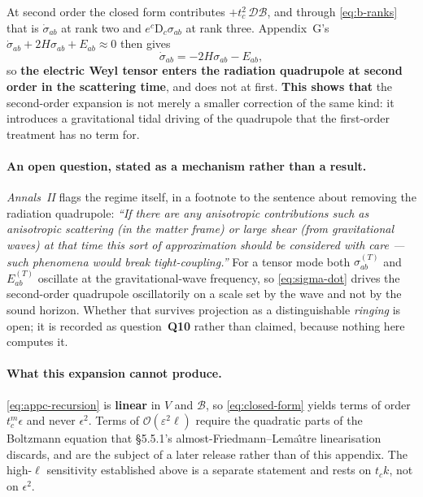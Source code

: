 At second order the closed form contributes $+t_c^2\,\mathcal D\mathcal B$, and
through \eqref{eq:b-ranks} that is $\dot\sigma_{ab}$ at rank two and
$e^c\mathrm D_c\sigma_{ab}$ at rank three. Appendix~G's
$\dot\sigma_{ab}+2H\sigma_{ab}+E_{ab}\approx0$ then gives
\begin{equation}
  \dot\sigma_{ab}=-2H\sigma_{ab}-E_{ab},
  \label{eq:sigma-dot}
\end{equation}
so \textbf{the electric Weyl tensor enters the radiation quadrupole at second
order in the scattering time}, and does not at first. \textbf{This shows that}
the second-order expansion is not merely a smaller correction of the same kind:
it introduces a gravitational tidal driving of the quadrupole that the
first-order treatment has no term for.

\paragraph{An open question, stated as a mechanism rather than a result.}
\emph{Annals~II} flags the regime itself, in a footnote to the sentence about
removing the radiation quadrupole: \emph{``If there are any anisotropic
contributions such as anisotropic scattering (in the matter frame) or large
shear (from gravitational waves) at that time this sort of approximation should
be considered with care --- such phenomena would break tight-coupling.''} For a
tensor mode both $\sigma^{(T)}_{ab}$ and $E^{(T)}_{ab}$ oscillate at the
gravitational-wave frequency, so \eqref{eq:sigma-dot} drives the second-order
quadrupole oscillatorily on a scale set by the wave and not by the sound
horizon. Whether that survives projection as a distinguishable \emph{ringing}
is open; it is recorded as question~\textbf{Q10} rather than claimed, because
nothing here computes it.

\paragraph{What this expansion cannot produce.} \eqref{eq:appc-recursion} is
\textbf{linear} in $V$ and $\mathcal B$, so \eqref{eq:closed-form} yields terms
of order $t_c^m\epsilon$ and never $\epsilon^2$. Terms of
$\mathcal O(\varepsilon^2\ell)$ require the quadratic parts of the Boltzmann
equation that \S5.5.1's almost-Friedmann--Lema\^{\i}tre linearisation discards,
and are the subject of a later release rather than of this appendix. The
high-$\ell$ sensitivity established above is a separate statement and rests on
$t_ck$, not on $\epsilon^2$.

